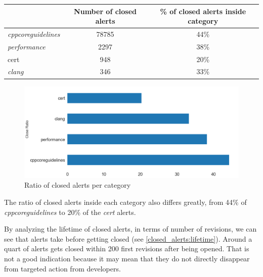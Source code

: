 \begin{table}[H]
	\centering
	\begin{tabular}{lcc}
		\hline
		& \textbf{Number of closed alerts} & \textbf{\% of closed alerts inside category} \\ \hline
		\textit{cppcoreguidelines} & 78785                            & 44\%                                         \\
		\textit{performance}       & 2297                             & 38\%                                         \\
		cert                       & 948                              & 20\%                                         \\
		\textit{clang}             & 346                              & 33\%                                         \\ \hline
	\end{tabular}
\end{table}

\begin{figure}[H]
	\centering
	\includegraphics[scale=0.4]{./src/data_analysis/closed_ratio_category.png}
	\caption{Ratio of closed alerts per category}
\end{figure}

The ratio of closed alerts inside each category also differs greatly, from 44\% of \textit{cppcoreguidelines} to 20\% of the \textit{cert} alerts.

By analyzing the lifetime of closed alerts, in terms of number of revisions, we can see that alerts take before getting closed (see \cref{closed_alerts:lifetime}). Around a quart of alerts gets closed within 200 first revisions after being opened. That is not a good indication because it may mean that they do not directly disappear from targeted action from developers.

